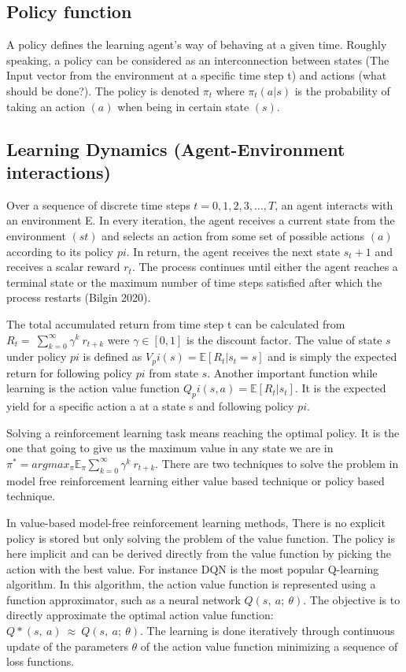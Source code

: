 \subsection{Policy function}
A policy defines the learning agent’s way of behaving at a given time. Roughly speaking, a policy can be considered as an interconnection between states (The Input vector from the environment at a specific time step t) and actions (what should be done?). The policy is denoted $\pi_t$ where $\pi_t\left(a|s\right)$ is the probability of taking an action $(a)$ when being in certain state $(s)$.

\subsection{Learning Dynamics (Agent-Environment interactions)}

Over a sequence of discrete time steps $t = {0, 1, 2, 3, …, T}$, an agent interacts with an environment E. In every iteration, the agent receives a current state from the environment $(st)$ and selects an action from some set of possible actions $(a)$ according to its policy $pi$. In return, the agent receives the next state $s_t+1$ and receives a scalar reward $r_t$. The process continues until either the agent reaches a terminal state or the maximum number of time steps satisfied after which the process restarts (Bilgin 2020).

The total accumulated return from time step t can be calculated from $R_t=\ \sum_{k=0}^{\infty}{\gamma^k{\ r}_{t+k}}$ were $\gamma \in [0, 1]$ is the discount factor. The value of state $s$ under policy $pi$ is defined as $V_pi(s) = \mathbb{E}\left[R_t|s_t = s\right]$ and is simply the expected return for following policy $pi$ from state $s$. Another important function while learning is the action value function $Q_pi(s, a) = \mathbb{E}\left[R_t|s_t\right]$. It is the expected yield for a specific action a at a state s and following policy $pi$. 

Solving a reinforcement learning task means reaching the optimal policy. It is the one that going to give us the maximum value in any state we are in $\pi^\ast= argmax_\pi \mathbb{E}_\pi\sum_{k=0}^{\infty}{\gamma^k{\ r}_{t+k}}$. There are two techniques to solve the problem in model free reinforcement learning either value based technique or policy based technique.

In value-based model-free reinforcement learning methods, There is no explicit policy is stored but only solving the problem of the value function. The policy is here implicit and can be derived directly from the value function by picking the action with the best value. For instance DQN is the most popular Q-learning algorithm. In this algorithm, the action value function is represented using a function approximator, such as a neural network $Q(s,\ a;\ \theta)$. The objective is to directly approximate the optimal action value function: $Q\ast(s,\ a)\ \approx\ Q(s,\ a;\ \theta)$. The learning is done iteratively through continuous update of the parameters $\theta$ of the action value function minimizing a sequence of loss functions.

